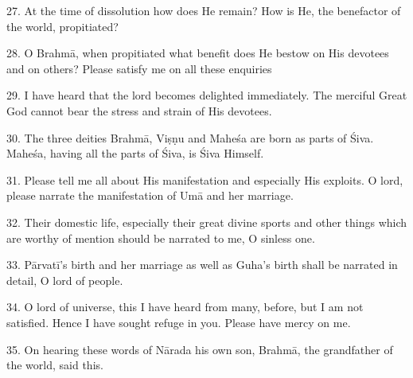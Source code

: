 27. At the time of dissolution how does He remain? How is He, the benefactor of
the world, propitiated?

28. O Brahmā, when propitiated what benefit does He bestow on His devotees and
on others? Please satisfy me on all these enquiries

29. I have heard that the lord becomes delighted immediately. The merciful Great
God cannot bear the stress and strain of His devotees.

30. The three deities Brahmā, Viṣṇu and Maheśa are born as parts of Śiva. Maheśa,
having all the parts of Śiva, is Śiva Himself.

31. Please tell me all about His manifestation and especially His exploits.
O lord, please narrate the manifestation of Umā and her marriage.

32. Their domestic life, especially their great divine sports and other things
which are worthy of mention should be narrated to me, O sinless one.

33. Pārvatī’s birth and her marriage as well as Guha’s birth shall be narrated
in detail, O lord of people.

34. O lord of universe, this I have heard from many, before, but I am not
satisfied. Hence I have sought refuge in you. Please have mercy on me.

35. On hearing these words of Nārada his own son, Brahmā, the grandfather of
the world, said this.

